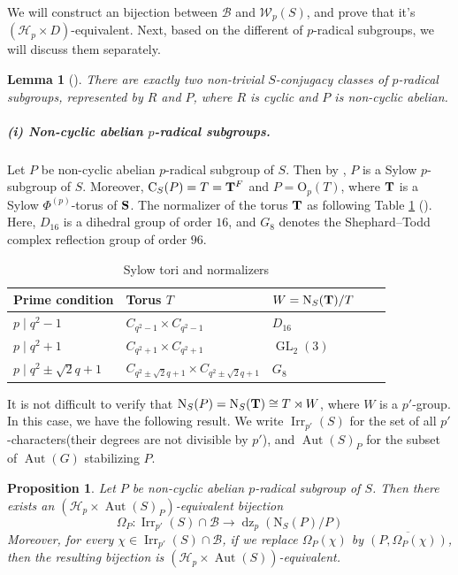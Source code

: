 \documentclass[11pt,a4paper]{article}
\numberwithin{equation}{section}
\newtheorem{proposition}[theorem]{Proposition}
\newtheorem{lemma}[theorem]{Lemma}
\theoremstyle{definition}
\theoremstyle{remark}
\newcommand{\Irr}{\operatorname{Irr}}
\newcommand{\Aut}{\operatorname{Aut}}
\newcommand{\GL}{\operatorname{GL}}
\newcommand{\dz}{\operatorname{dz}}
\newcommand{\OO}{\mathrm{O}}
\newcommand{\HH}{\mathcal H}
\newcommand{\WW}{\mathcal W}
\newcommand{\NN}{\mathrm N}
\newcommand{\CC}{\mathrm C}
\begin{document}
We will construct an bijection between $\mathcal{B}$ and $\WW_p(S)$, and prove that it's $(\HH_p\times D)$-equivalent.
Next, based on the different of $p$-radical subgroups, we will discuss them separately.



\begin{lemma}[{\cite[(2B)]{An}}]\label{p3:prop:radical}
There are exactly two non-trivial \(S\)-conjugacy classes of \(p\)-radical subgroups, represented by $R$ and $P$, where $R$ is cyclic and $P$ is non-cyclic abelian.
\end{lemma}
\subparagraph{(i) Non-cyclic abelian \(p\)-radical subgroups.}
Let $P$ be non-cyclic abelian \(p\)-radical subgroup of $S$. Then by \cite[(2B)-(b)]{An}, $P$ is a Sylow $p$-subgroup of $S$. Moreover, $\CC_S(P)=T={\bf T}^F$ and $P=\OO_p(T)$, where ${\bf T}$ is a Sylow $\Phi^{(p)}$-torus of $\bf S$. The normalizer of the torus ${\bf T}$ as following Table \ref{tab:1} (\cite[TABLE I]{An}). 
Here, $D_{16}$ is a dihedral group of order $16$, and $G_8$ denotes the Shephard--Todd complex reflection group of order $96$.
\begin{table}[ht]
\centering
\caption{Sylow tori and normalizers}\label{tab:1}
\begin{tabular}{@{}lllrr@{}}
\toprule
Prime condition &Torus $T$ & $W=\NN_S({\bf T})/T$\\
\midrule
$p\mid q^2-1$ & $C_{q^2-1}\times C_{q^2-1}$ & $D_{16}$\\
$p\mid q^2+1$ & $C_{q^2+1}\times C_{q^2+1}$ & $\GL_2(3)$\\
$p\mid q^2\pm\sqrt{2}q+1$ & $C_{q^2\pm\sqrt{2}q+1}\times C_{q^2\pm\sqrt{2}q+1}$ & $G_8$\\
\bottomrule
\end{tabular}
\end{table}
It is not difficult to verify that $\NN_S(P)=\NN_S({\bf T})\cong T\rtimes W$, where $W$ is a $p'$-group. In this case, we have the following result. We write $\Irr_{p'}(S)$ for the set of all $p'$-characters(their degrees are not divisible by $p'$), and $\Aut(S)_P$ for the subset of $\Aut(G)$ stabilizing $P$.
\begin{proposition}\label{bij: rank-two}
Let $P$ be non-cyclic abelian \(p\)-radical subgroup of $S$. Then there exists an $(\HH_p\times \Aut(S)_P)$-equivalent bijection
\begin{equation}
\Omega_P:\Irr_{p'}(S)\cap \mathcal{B}\longrightarrow\dz_p(\NN_S(P)/P) 
\end{equation}
Moreover, for every \(\chi\in\Irr_{p'}(S)\cap \mathcal{B}\), if we replace $\Omega_P(\chi)$ by  $\overline{(P,\Omega_P(\chi))}$, then the resulting bijection is $(\HH_p\times \Aut(S))$-equivalent.
\end{proposition}
\end{document}
